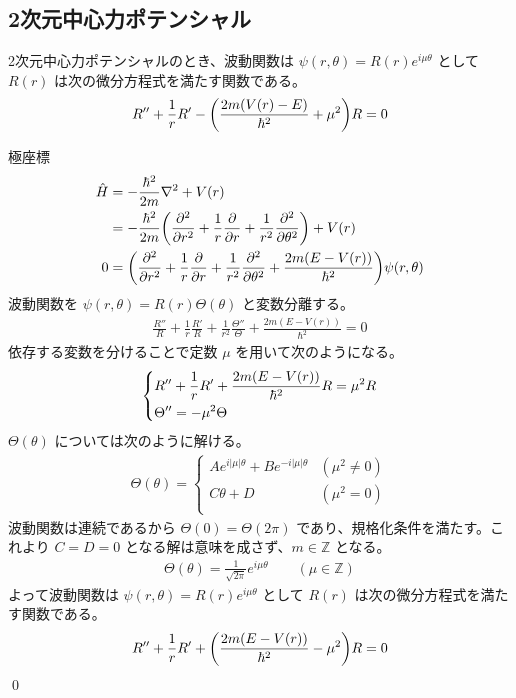 \documentclass[uplatex,dvipdfmx,a4paper,11pt]{jlreq}
\makeatletter
\newcommand{\ZZ}{\mathbb{Z}}
\numberwithin{equation}{section}
\theoremstyle{definition}
\renewenvironment{proof}[1][\proofname]{\par
  \normalfont
  \topsep6\p@\@plus6\p@ \trivlist
  \item[\hskip\labelsep{\bfseries #1}\@addpunct{\bfseries}]\ignorespaces\quad\par
}{%
  \qed\endtrivlist\@endpefalse
}
\renewcommand\proofname{証明}
\makeatother
\begin{document}
\subsection{2次元中心力ポテンシャル}
\begin{proposition}
  2次元中心力ポテンシャルのとき、波動関数は $\psi(r, \theta) = R(r)e^{i\mu\theta}$ として $R(r)$ は次の微分方程式を満たす関数である。
  \begin{align}
    R'' + \frac{1}{r}R' - \qty(\frac{2m(V(r) - E)}{\hbar^2} + \mu^2)R = 0
  \end{align}
\end{proposition}
\begin{proof}
  極座標
  \begin{align}
    \hat{H} & = -\frac{\hbar^2}{2m}\laplacian + V(r)                                                                               \\
            & = -\frac{\hbar^2}{2m}\qty(\pdv[2]{r} + \frac{1}{r}\pdv{r} + \frac{1}{r^2}\pdv[2]{\theta}) + V(r)                     \\
    0       & = \qty(\pdv[2]{r} + \frac{1}{r}\pdv{r} + \frac{1}{r^2}\pdv[2]{\theta} + \frac{2m(E - V(r))}{\hbar^2})\psi(r, \theta)
  \end{align}
  波動関数を $\psi(r, \theta) = R(r)\Theta(\theta)$ と変数分離する。
  \begin{align}
    \frac{R''}{R} + \frac{1}{r}\frac{R'}{R} + \frac{1}{r^2}\frac{\Theta''}{\Theta} + \frac{2m(E - V(r))}{\hbar^2} = 0
  \end{align}
  依存する変数を分けることで定数 $\mu$ を用いて次のようになる。
  \begin{align}
    \begin{dcases}
      R'' + \frac{1}{r}R' + \frac{2m(E - V(r))}{\hbar^2}R = \mu^2R \\
      \Theta'' = -\mu^2\Theta
    \end{dcases}
  \end{align}
  $\Theta(\theta)$ については次のように解ける。
  \begin{align}
    \Theta(\theta) = \begin{cases}
                       Ae^{i|\mu|\theta} + Be^{-i|\mu|\theta} & (\mu^2 \neq 0) \\
                       C\theta + D                            & (\mu^2 = 0)    \\
                     \end{cases}
  \end{align}
  波動関数は連続であるから $\Theta(0) = \Theta(2\pi)$ であり、規格化条件を満たす。これより $C = D = 0$ となる解は意味を成さず、$m\in\ZZ$ となる。
  \begin{align}
    \Theta(\theta) = \frac{1}{\sqrt{2\pi}}e^{i\mu\theta} \qquad (\mu\in\ZZ)
  \end{align}
  よって波動関数は $\psi(r, \theta) = R(r)e^{i\mu\theta}$ として $R(r)$ は次の微分方程式を満たす関数である。
  \begin{align}
    R'' + \frac{1}{r}R' + \qty(\frac{2m(E - V(r))}{\hbar^2} - \mu^2)R = 0
  \end{align}
\end{proof}
\end{document}
